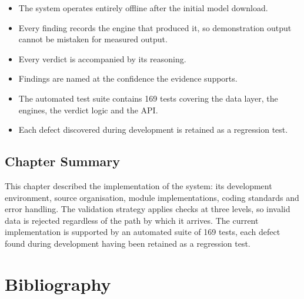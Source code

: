 \documentclass[12pt,a4paper,twoside]{report}
\begin{document}
\begin{itemize}
\item The system operates entirely offline after the initial model download.
\item Every finding records the engine that produced it, so demonstration output cannot be mistaken for measured output.
\item Every verdict is accompanied by its reasoning.
\item Findings are named at the confidence the evidence supports.
\item The automated test suite contains 169 tests covering the data layer, the engines, the verdict logic and the API.
\item Each defect discovered during development is retained as a regression test.
\end{itemize}

\section{Chapter Summary}

This chapter described the implementation of the system: its development environment, source organisation, module implementations, coding standards and error handling. The validation strategy applies checks at three levels, so invalid data is rejected regardless of the path by which it arrives. The current implementation is supported by an automated suite of 169 tests, each defect found during development having been retained as a regression test.

\newpage
\centering
    \chapter*{Bibliography}
\end{document}
